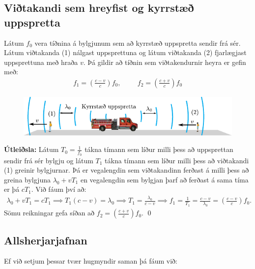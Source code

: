 \subsection*{Viðtakandi sem hreyfist og kyrrstæð uppspretta}

\begin{tcolorbox}
\begin{theorem}
Látum $f_0$ vera tíðnina á bylgjunum sem að kyrrstæð uppspretta sendir frá sér. Látum viðtakanda (1) nálgast uppsprettuna og látum viðtakanda (2) fjarlægjast uppsprettuna með hraða $v$. Þá gildir að tíðnin sem viðtakendurnir heyra er gefin með:
\begin{align*}
    f_1 = \left( \frac{c-v}{c} \right)f_0, \hspace{1cm} f_2 = \left( \frac{c+v}{c} \right)f_0
\end{align*}
\begin{figure}[H]
    \centering
    \vspace{-0.5cm}
    \includegraphics[scale = 0.8]{figures/doppler-brunabill-kyrr.pdf}
\end{figure}
\end{theorem}
\end{tcolorbox}

\textbf{Útleiðsla:} Látum $T_0 = \frac{1}{f_0}$ tákna tímann sem líður milli þess að uppsprettan sendir frá sér bylgju og látum $T_1$ tákna tímann sem líður milli þess að viðtakandi (1) greinir bylgjurnar. Þá er vegalengdin sem viðtakandinn ferðast á milli þess að greina bylgjuna $\lambda_0 + vT_1$ en vegalengdin sem bylgjan þarf að ferðast á sama tíma er þá $cT_1$. Við fáum því að:
\begin{align*}
    \lambda_0 + vT_1 = cT_1 \implies T_1 (c-v) = \lambda_0 \implies T_1 = \frac{\lambda_0}{c-v} \implies f_1 = \frac{1}{T_1} = \frac{c-v}{\lambda_0} = \left(\frac{c-v}{c}\right) f_0.
\end{align*}
Sömu reikningar gefa síðan að $f_2 = \left(\frac{c+v}{c} \right)f_0$.
\qed

\subsection*{Allsherjarjafnan}

Ef við setjum þessar tvær hugmyndir saman þá fáum við:

